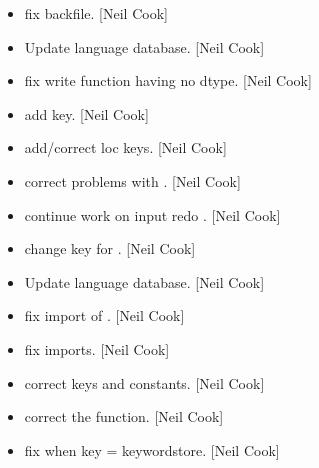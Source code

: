 \documentclass[a4paper,10pt,english]{report}
\begin{document}
\begin{itemize}
\item {} 
 \sphinxhyphen{} fix backfile. {[}Neil Cook{]}

\item {} 
Update language database. {[}Neil Cook{]}

\item {} 
 \sphinxhyphen{} fix write function having no dtype. {[}Neil Cook{]}

\item {} 
 \sphinxhyphen{} add  key. {[}Neil
Cook{]}

\item {} 
 \sphinxhyphen{} add/correct loc keys. {[}Neil Cook{]}

\item {} 
 \sphinxhyphen{} correct problems with . {[}Neil Cook{]}

\item {} 
 \sphinxhyphen{} continue work on input redo . {[}Neil Cook{]}

\item {} 
 \sphinxhyphen{} change key for . {[}Neil Cook{]}

\item {} 
Update language database. {[}Neil Cook{]}

\item {} 
 \sphinxhyphen{} fix import of . {[}Neil Cook{]}

\item {} 
 \sphinxhyphen{} fix imports. {[}Neil Cook{]}

\item {} 
 \sphinxhyphen{} correct keys and constants. {[}Neil
Cook{]}

\item {} 
 \sphinxhyphen{} correct the  function. {[}Neil Cook{]}

\item {} 
 \sphinxhyphen{} fix when key = keywordstore. {[}Neil Cook{]}


\end{itemize}
\end{document}
